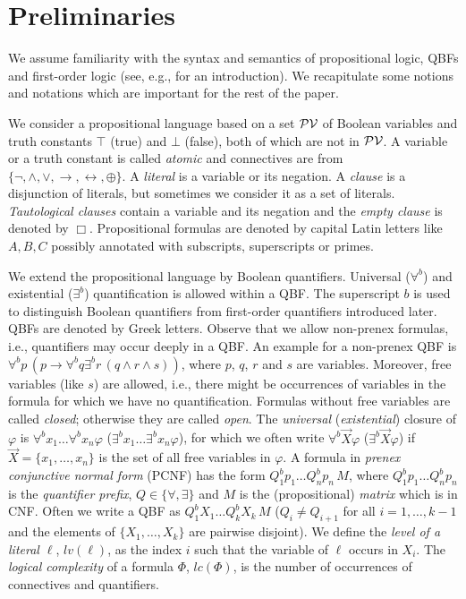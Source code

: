 \documentclass{llncs}
\newcommand{\propvars}{{\cal PV}}
\newcommand{\falsum}{\bot}
\newcommand{\verum}{\top}
\newcommand{\impl}{\rightarrow}
\newcommand{\lequiv}{\leftrightarrow}
\newcommand{\xor}{\oplus}
\newcommand{\lc}[1]{\mathit{lc}(#1)}
\newcommand{\level}[1]{{\mathit lv(#1)}}
\begin{document}
\section{Preliminaries}\label{sec:prel}


We assume familiarity with the syntax and semantics of propositional
logic, QBFs and first-order logic (see, e.g.,
\cite{Leitsch-resolution1997} for an introduction). We recapitulate
some notions and notations which are important for the rest of the
paper.

We consider a propositional language based on a set $\propvars$ of
Boolean variables and truth constants $\verum$ (true) and $\falsum$
(false), both of which are not in $\propvars$. A variable or a truth
constant is called \emph{atomic} and connectives are from $\{\neg,
\land, \lor, \impl, \lequiv, \xor\}$.
A \emph{literal} is a variable or its negation.  A \emph{clause} is a
disjunction of literals, but sometimes we consider it as a set of
literals. \emph{Tautological clauses} contain a variable and its
negation and the \emph{empty clause} is denoted by $\Box$.
Propositional formulas are denoted by capital Latin letters like $A,
B, C$ possibly annotated with subscripts, superscripts or primes.

We extend the propositional language by Boolean quantifiers.
Universal ($\forall^b$) and existential ($\exists^b$) quantification
is allowed within a QBF.  The superscript $b$ is used to distinguish
Boolean quantifiers from first-order quantifiers introduced later.
QBFs are denoted by Greek letters.  Observe that we allow non-prenex
formulas, i.e., quantifiers may occur deeply in a QBF.
An example for a non-prenex QBF is
$\forall^b p\, (p \impl \forall^b q \exists^b r \, (q\land r\land
s))$, where $p$, $q$, $r$ and $s$ are variables.  Moreover, free
variables (like $s$) are allowed, i.e., there might be occurrences of
variables in the formula for which we have no quantification. Formulas
without free variables are called \emph{closed}; otherwise they are
called \emph{open}. The \emph{universal} (\emph{existential}) closure
of $\varphi$ is $\forall^b x_1 \ldots \forall^b x_n \varphi$
($\exists^b x_1 \ldots \exists^b x_n \varphi$), for which we often
write $\forall^b \vec{X} \varphi$ ($\exists^b \vec{X} \varphi$) if
$\vec{X} = \{x_1, \ldots ,x_n\}$ is the set of all free variables in
$\varphi$.  A formula in \emph{prenex conjunctive normal form} (PCNF)
has the form $Q_1^bp_1\ldots Q_n^bp_n \, M$, where $Q_1^bp_1\ldots
Q_n^bp_n$ is the \emph{quantifier prefix}, $Q\in \{ \forall, \exists
\}$ and $M$ is the (propositional) \emph{matrix} which is in CNF.
Often we write a QBF as $Q_1^bX_1\ldots Q_k^bX_k \, M$ ($Q_i \neq
Q_{i+1}$ for all $i=1, \ldots , k-1$ and the elements of $\{X_1,
\ldots , X_k\}$ are pairwise disjoint). We define the \emph{level of a
  literal $\ell$}, $\level{\ell}$, as the index $i$ such that the
variable of $\ell$ occurs in $X_i$.  The \emph{logical complexity} of a
formula $\Phi$, $\lc{\Phi}$, is the number of occurrences of
connectives and quantifiers.
\end{document}
